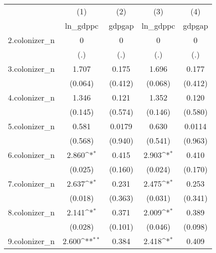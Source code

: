 {
\def\sym#1{\ifmmode^{#1}\else\(^{#1}\)\fi}
\begin{tabular}{l*{4}{c}}
\hline\hline
            &\multicolumn{1}{c}{(1)}&\multicolumn{1}{c}{(2)}&\multicolumn{1}{c}{(3)}&\multicolumn{1}{c}{(4)}\\
            &\multicolumn{1}{c}{ln\_gdppc}&\multicolumn{1}{c}{gdpgap}&\multicolumn{1}{c}{ln\_gdppc}&\multicolumn{1}{c}{gdpgap}\\
\hline
2.colonizer\_n&           0         &           0         &           0         &           0         \\
            &         (.)         &         (.)         &         (.)         &         (.)         \\
[1em]
3.colonizer\_n&       1.707         &       0.175         &       1.696         &       0.177         \\
            &     (0.064)         &     (0.412)         &     (0.068)         &     (0.412)         \\
[1em]
4.colonizer\_n&       1.346         &       0.121         &       1.352         &       0.120         \\
            &     (0.145)         &     (0.574)         &     (0.146)         &     (0.580)         \\
[1em]
5.colonizer\_n&       0.581         &      0.0179         &       0.630         &      0.0114         \\
            &     (0.568)         &     (0.940)         &     (0.541)         &     (0.963)         \\
[1em]
6.colonizer\_n&       2.860\sym{*}  &       0.415         &       2.903\sym{*}  &       0.410         \\
            &     (0.025)         &     (0.160)         &     (0.024)         &     (0.170)         \\
[1em]
7.colonizer\_n&       2.637\sym{*}  &       0.231         &       2.475\sym{*}  &       0.253         \\
            &     (0.018)         &     (0.363)         &     (0.031)         &     (0.341)         \\
[1em]
8.colonizer\_n&       2.141\sym{*}  &       0.371         &       2.009\sym{*}  &       0.389         \\
            &     (0.028)         &     (0.101)         &     (0.046)         &     (0.098)         \\
[1em]
9.colonizer\_n&       2.600\sym{**} &       0.384         &       2.418\sym{*}  &       0.409         \\

\end{tabular}}
